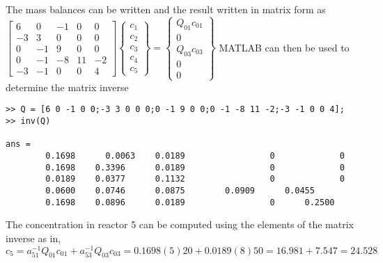 \documentclass[../main.tex]{subfiles}
\begin{document}
\begin{enumerate}[label=\bfseries(\alph*)]
The mass balances can be written and the result written in matrix form as
\bigbreak
$\left[\begin{array}{ccccc}
6 & 0 & -1 & 0 & 0 \\
-3 & 3 & 0 & 0 & 0 \\
0 & -1 & 9 & 0 & 0 \\
0 & -1 & -8 & 11 & -2 \\
-3 & -1 & 0 & 0 & 4
\end{array}\right]\left\{\begin{array}{l}
c_{1} \\
c_{2} \\
c_{3} \\
c_{4} \\
c_{5}
\end{array}\right\}=\left\{\begin{array}{c}
Q_{01} c_{01} \\
0 \\
Q_{03} c_{03} \\
0 \\
0
\end{array}\right\}$
\bigbreak
MATLAB can then be used to determine the matrix inverse
\bigbreak
\begin{lstlisting}[numbers=none]
>> Q = [6 0 -1 0 0;-3 3 0 0 0;0 -1 9 0 0;0 -1 -8 11 -2;-3 -1 0 0 4];
>> inv(Q)

ans =
 		0.1698	 	0.0063 	  0.0189 				 0 			   0
 		0.1698 	  0.3396 	  0.0189 				 0 			   0 
 		0.0189 	  0.0377 	  0.1132 				 0 			   0
 		0.0600 	  0.0746 	  0.0875 		0.0909 		0.0455
		0.1698 	  0.0896 	  0.0189 				 0 		0.2500
\end{lstlisting}
\bigbreak
The concentration in reactor 5 can be computed using the elements of the matrix inverse as in,
\bigbreak
$c_{5}=a_{51}^{-1} Q_{01} c_{01}+a_{53}^{-1} Q_{03} c_{03}=0.1698(5) 20+0.0189(8) 50=16.981+7.547=24.528$
\bigbreak


\section{}


\end{enumerate}
\end{document}
